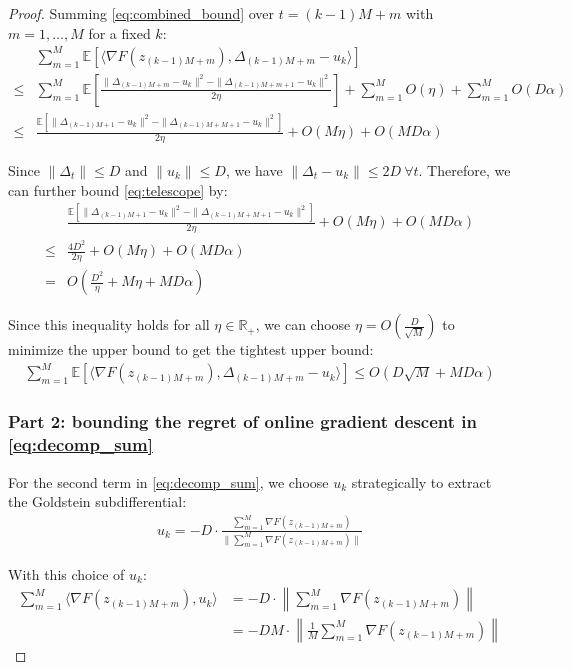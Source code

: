 \documentclass[letterpaper]{article} %
\newcommand{\1}{\mathbf{1}}
\begin{document}
\begin{proof}
Summing \eqref{eq:combined_bound} over $t = (k-1)M + m$ with $m = 1, \ldots, M$ for a fixed $k$:
\begin{align}
& \sum_{m=1}^M \mathbb{E}[\langle \nabla F(z_{(k-1)M+m}), \Delta_{(k-1)M+m} - u_k \rangle] \nonumber\\
\leq & \sum_{m=1}^M \mathbb{E}\left[\frac{\|\Delta_{(k-1)M+m} - u_k\|^2 - \|\Delta_{(k-1)M+m+1} - u_k\|^2}{2\eta}\right] + \sum_{m=1}^M O(\eta) + \sum_{m=1}^M O(D\alpha) \label{eq:sum_m}\\
\leq & \frac{\mathbb{E}[\|\Delta_{(k-1)M+1} - u_k\|^2 - \|\Delta_{(k-1)M+M+1} - u_k\|^2]}{2\eta} + O(M \eta) +  O(M D\alpha) \label{eq:telescope}
\end{align}

Since $\|\Delta_t\| \leq D$ and $\|u_k\| \leq D$, we have $\|\Delta_t - u_k\| \leq 2D ~\forall t$. Therefore, we can further bound \eqref{eq:telescope} by:
\begin{align}
& \frac{\mathbb{E}[\|\Delta_{(k-1)M+1} - u_k\|^2 - \|\Delta_{(k-1)M+M+1} - u_k\|^2]}{2\eta} + O(M \eta) +  O(M D\alpha) \\
\leq & \frac{4D^2}{2\eta} +O(M \eta) + O(M D\alpha) \nonumber\\
= & O(\frac{D^2}{\eta} + M\eta + MD\alpha)  
\end{align}

Since this inequality holds for all $\eta \in \mathbb{R}_+$, we can choose $\eta = O(\frac{D}{\sqrt{M}})$ to minimize the upper bound to get the tightest upper bound:
\begin{align}
     \sum_{m=1}^M \mathbb{E}[\langle \nabla F(z_{(k-1)M+m}), \Delta_{(k-1)M+m} - u_k \rangle] \leq O(D \sqrt{M} + MD \alpha) \label{eq:bound_sum_m}
\end{align}

\subsubsection*{Part 2: bounding the regret of online gradient descent in \cref{eq:decomp_sum}}
For the second term in \eqref{eq:decomp_sum}, we choose $u_k$ strategically to extract the Goldstein subdifferential:
\begin{align}
u_k = -D \cdot \frac{\sum_{m=1}^M \nabla F(z_{(k-1)M+m})}{\|\sum_{m=1}^M \nabla F(z_{(k-1)M+m})\|} \label{eq:u_k_choice}
\end{align}

With this choice of $u_k$:
\begin{align}
\sum_{m=1}^M \langle \nabla F(z_{(k-1)M+m}), u_k \rangle &= -D \cdot \left\|\sum_{m=1}^M \nabla F(z_{(k-1)M+m})\right\| \label{eq:extract_norm}\\
&= -D M \cdot \left\|\frac{1}{M}\sum_{m=1}^M \nabla F(z_{(k-1)M+m})\right\| \label{eq:avg_grad}
\end{align}


\end{proof}
\end{document}
